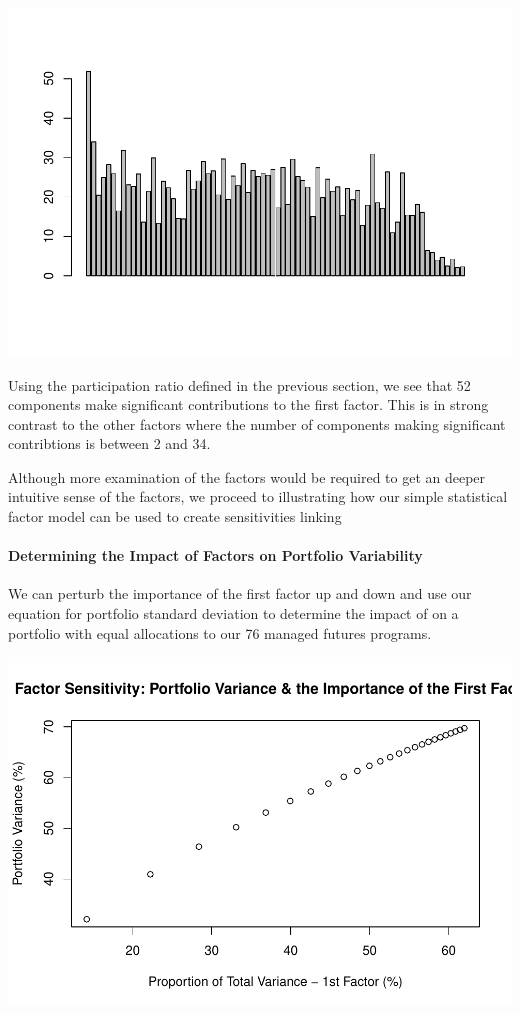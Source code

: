 \documentclass[]{article}
\begin{document}
\includegraphics{diversificationInTheManagedFuturesUniverse_files/figure-latex/unnamed-chunk-53-1.pdf}

Using the participation ratio defined in the previous section, we see
that 52 components make significant contributions to the first factor.
This is in strong contrast to the other factors where the number of
components making significant contribtions is between 2 and 34.

Although more examination of the factors would be required to get an
deeper intuitive sense of the factors, we proceed to illustrating how
our simple statistical factor model can be used to create sensitivities
linking

\paragraph{Determining the Impact of Factors on Portfolio
Variability}\label{determining-the-impact-of-factors-on-portfolio-variability}

We can perturb the importance of the first factor up and down and use
our equation for portfolio standard deviation to determine the impact of
on a portfolio with equal allocations to our 76 managed futures
programs.

\includegraphics{diversificationInTheManagedFuturesUniverse_files/figure-latex/unnamed-chunk-54-1.pdf}
\end{document}
